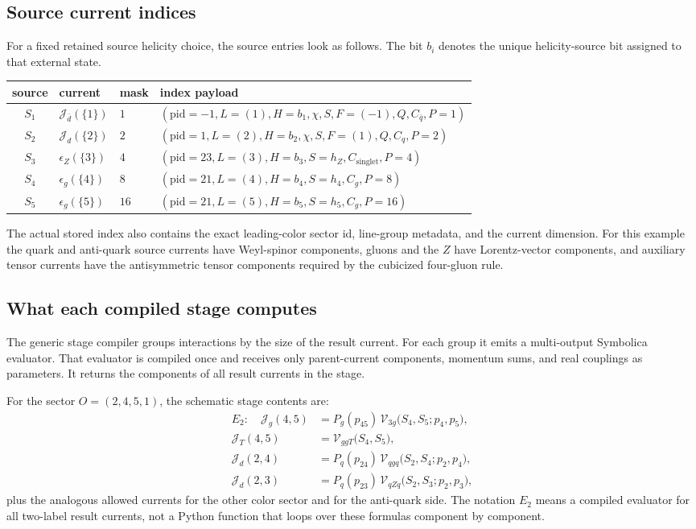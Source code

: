\documentclass[10pt]{article}
\newcommand{\J}{\mathcal{J}}
\newcommand{\V}{\mathcal{V}}
\begin{document}
\subsection*{Source current indices}

For a fixed retained source helicity choice, the source entries look as follows.
The bit $b_i$ denotes the unique helicity-source bit assigned to that external
state.
\begin{center}
\begin{tabular}{@{}c L{1.4in} L{0.85in} L{2.85in}@{}}
\toprule
\textbf{source} & \textbf{current} & \textbf{mask} & \textbf{index payload} \\
\midrule
$S_1$ & $\J_{\bar d}(\{1\})$ & $1$ &
$(\mathrm{pid}=-1,L=(1),H=b_1,\chi,S,F=(-1),Q,C_{\bar q},P=1)$ \\
$S_2$ & $\J_d(\{2\})$ & $2$ &
$(\mathrm{pid}=1,L=(2),H=b_2,\chi,S,F=(1),Q,C_q,P=2)$ \\
$S_3$ & $\epsilon_Z(\{3\})$ & $4$ &
$(\mathrm{pid}=23,L=(3),H=b_3,S=h_Z,C_{\mathrm{singlet}},P=4)$ \\
$S_4$ & $\epsilon_g(\{4\})$ & $8$ &
$(\mathrm{pid}=21,L=(4),H=b_4,S=h_4,C_g,P=8)$ \\
$S_5$ & $\epsilon_g(\{5\})$ & $16$ &
$(\mathrm{pid}=21,L=(5),H=b_5,S=h_5,C_g,P=16)$ \\
\bottomrule
\end{tabular}
\end{center}
The actual stored index also contains the exact leading-color sector id,
line-group metadata, and the current dimension.  For this example the quark
and anti-quark source currents have Weyl-spinor components, gluons and the
$Z$ have Lorentz-vector components, and auxiliary tensor currents have the
antisymmetric tensor components required by the cubicized four-gluon rule.

\subsection*{What each compiled stage computes}

The generic stage compiler groups interactions by the size of the result
current.  For each group it emits a multi-output Symbolica evaluator.  That
evaluator is compiled once and receives only parent-current components,
momentum sums, and real couplings as parameters.  It returns the components of
all result currents in the stage.

For the sector $O=(2,4,5,1)$, the schematic stage contents are:
\begin{align}
E_2:\quad
  \J_g(4,5) &=
    P_g(p_{45})\,\V_{3g}\bigl(S_4,S_5;p_4,p_5\bigr),\\
  \J_T(4,5) &=
    \V_{ggT}\bigl(S_4,S_5\bigr),\\
  \J_d(2,4) &=
    P_q(p_{24})\,\V_{qgq}\bigl(S_2,S_4;p_2,p_4\bigr),\\
  \J_d(2,3) &=
    P_q(p_{23})\,\V_{qZq}\bigl(S_2,S_3;p_2,p_3\bigr),
    \label{eq:e2-stage}
\end{align}
plus the analogous allowed currents for the other color sector and for the
anti-quark side.  The notation $E_2$ means a compiled evaluator for all
two-label result currents, not a Python function that loops over these
formulas component by component.
\end{document}
